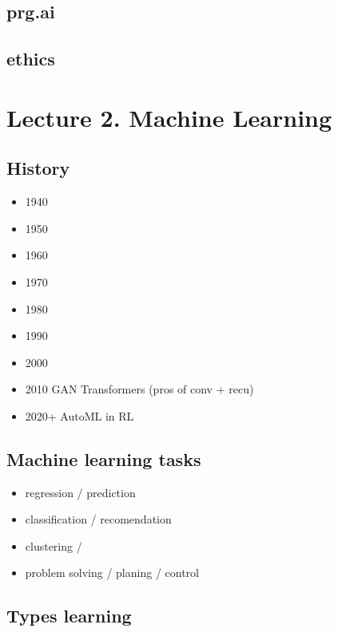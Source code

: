 \documentclass[12pt, letterpaper, twoside]{article}
\begin{document}
\subsection*{prg.ai}

\subsection*{ethics}

\section{Lecture 2. Machine Learning}

\subsection*{}

\subsection*{History}

\begin{itemize}
    \item 1940
    \item 1950
    \item 1960
    \item 1970
    \item 1980
    \item 1990
    \item 2000
    \item 2010
    \subitem GAN
    \subitem Transformers (pros of conv + recu)
    \item 2020+
    \subitem AutoML in RL
\end{itemize}

\subsection*{Machine learning tasks}

\begin{itemize}
    \item regression / prediction
    \item classification / recomendation
    \item clustering / 
    \item problem solving / planing / control 
\end{itemize}

\subsection{Types learning}
\end{document}
